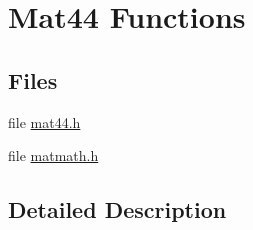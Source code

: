 \hypertarget{group___m_a_t___m_a_t_h___f_u_n_c_s}{}\section{Mat44 Functions}
\label{group___m_a_t___m_a_t_h___f_u_n_c_s}
\subsection*{Files}
\begin{DoxyCompactItemize}
\item 
file \hyperlink{mat44_8h}{mat44.\+h}
\item 
file \hyperlink{matmath_8h}{matmath.\+h}
\end{DoxyCompactItemize}


\subsection{Detailed Description}
